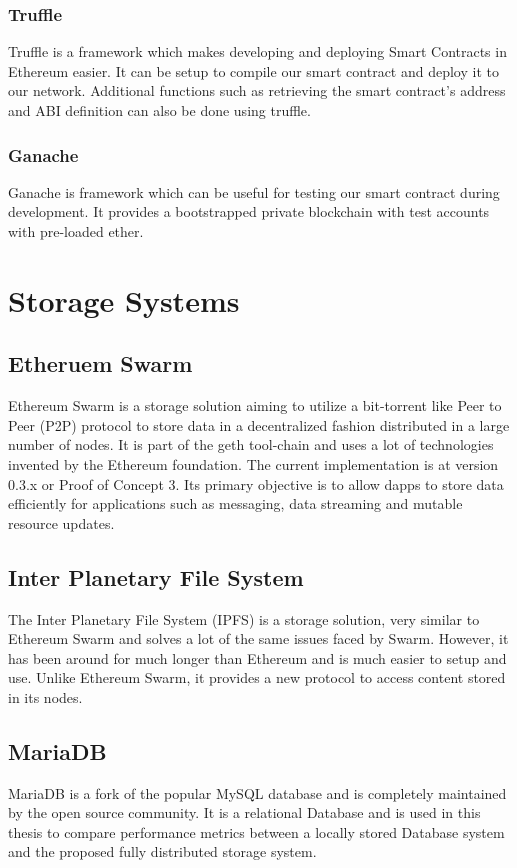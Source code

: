 \documentclass[11pt,openright]{report}
\begin{document}
\subsubsection{Truffle}
Truffle is a framework which makes developing and deploying Smart Contracts in Ethereum easier. It can be setup to compile our smart contract and deploy it to our network. Additional functions such as retrieving the smart contract's address and ABI definition can also be done using truffle.

\subsubsection{Ganache}
Ganache is framework which can be useful for testing our smart contract during development. It provides a bootstrapped private blockchain with test accounts with pre-loaded ether.

\section{Storage Systems}
\subsection{Etheruem Swarm}
Ethereum Swarm is a storage solution aiming to utilize a bit-torrent like Peer to Peer (P2P) protocol to store data  in a decentralized fashion distributed in a large number of nodes. It is part of the geth tool-chain and uses a lot of technologies invented by the Ethereum foundation. The current implementation is at version 0.3.x or Proof of Concept 3. Its primary objective is to allow dapps to store data efficiently for applications such as messaging, data streaming and mutable resource updates.

\subsection{Inter Planetary File System}
The Inter Planetary File System (IPFS) is a storage solution, very similar to Ethereum Swarm and solves a lot of the same issues faced by Swarm. However, it has been around for much longer than Ethereum and is much easier to setup and use. Unlike Ethereum Swarm, it provides a new protocol to access content stored in its nodes.

\subsection{MariaDB}
MariaDB is a fork of the popular MySQL database and is completely maintained by the open source community. It is a relational Database and is used in this thesis to compare performance metrics between a locally stored Database system and the proposed fully distributed storage system.
\end{document}
